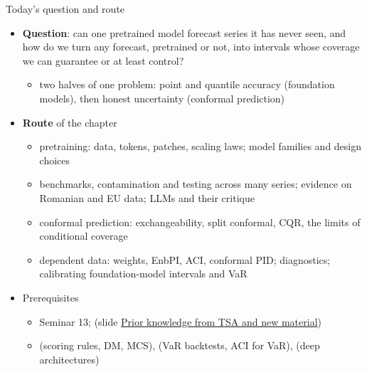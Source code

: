 \begin{frame}{Today's question and route}
\itemsize{\small}
\begin{itemize}
    \item \textbf{Question}: can one pretrained model forecast series it has never seen, and how do we turn any forecast, pretrained or not, into intervals whose coverage we can guarantee or at least control?
    \begin{itemize}
        \item two halves of one problem: point and quantile accuracy (foundation models), then honest uncertainty (conformal prediction)
    \end{itemize}
    \item \textbf{Route} of the chapter
    \begin{itemize}
        \item pretraining: data, tokens, patches, scaling laws; model families and design choices
        \item benchmarks, contamination and testing across many series; evidence on Romanian and EU data; LLMs and their critique
        \item conformal prediction: exchangeability, split conformal, CQR, the limits of conditional coverage
        \item dependent data: weights, EnbPI, ACI, conformal PID; diagnostics; calibrating foundation-model intervals and VaR
    \end{itemize}
    \item Prerequisites
    \begin{itemize}
        \item Seminar 13;  (slide \hyperlink{c13known}{\textcolor{MainBlue}{Prior knowledge from TSA and new material}})
        \item {} (scoring rules, DM, MCS),  (VaR backtests, ACI for VaR),  (deep architectures)
    \end{itemize}
\end{itemize}
\end{frame}

